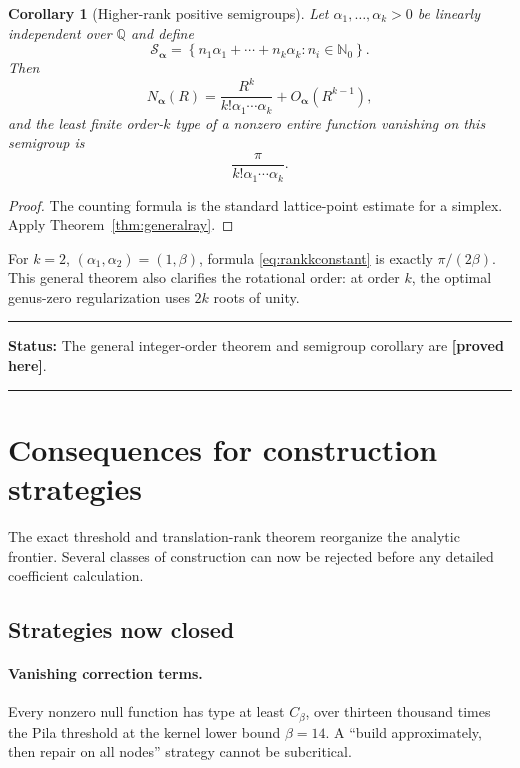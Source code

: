 \documentclass[11pt,oneside]{article}
\newtheorem{corollary}[theorem]{Corollary}
\theoremstyle{definition}
\theoremstyle{remark}
\newcommand{\Nzero}{\mathbb N_0}
\newcommand{\Q}{\mathbb Q}
\newcommand{\Cbeta}{C_\beta}
\newcommand{\statusproved}{\textcolor{provedgreen}{\textbf{[proved here]}}}
\newenvironment{statusbox}[1]
{\begin{center}\begin{minipage}{0.94\textwidth}\raggedright\hrule\vspace{0.45em}\textbf{Status:} #1\par\vspace{0.35em}}
{\vspace{0.35em}\hrule\end{minipage}\end{center}}
\begin{document}
\begin{corollary}[Higher-rank positive semigroups]
\label{cor:rankksemigroup}
Let $\alpha_1,\dots,\alpha_k>0$ be linearly independent over $\Q$ and define
\[
 \mathcal S_{\boldsymbol\alpha}
 =\left\{n_1\alpha_1+\cdots+n_k\alpha_k:n_i\in\Nzero\right\}.
\]
Then
\[
 N_{\boldsymbol\alpha}(R)
 =\frac{R^k}{k!\alpha_1\cdots\alpha_k}+O_{\boldsymbol\alpha}(R^{k-1}),
\]
and the least finite order-$k$ type of a nonzero entire function vanishing on this semigroup
is
\begin{equation}
 \frac{\pi}{k!\alpha_1\cdots\alpha_k}.
 \label{eq:rankkconstant}
\end{equation}
\end{corollary}

\begin{proof}
The counting formula is the standard lattice-point estimate for a simplex.  Apply
Theorem~\ref{thm:generalray}.
\end{proof}

For $k=2$, $(\alpha_1,\alpha_2)=(1,\beta)$, formula
\eqref{eq:rankkconstant} is exactly $\pi/(2\beta)$.  This general theorem also clarifies the
rotational order: at order $k$, the optimal genus-zero regularization uses $2k$ roots of
unity.

\begin{statusbox}{The general integer-order theorem and semigroup corollary are
\statusproved.}
\end{statusbox}

\section{Consequences for construction strategies}
\label{sec:strategy}

The exact threshold and translation-rank theorem reorganize the analytic frontier.  Several
classes of construction can now be rejected before any detailed coefficient calculation.

\subsection{Strategies now closed}

\paragraph{Vanishing correction terms.}
Every nonzero null function has type at least $\Cbeta$, over thirteen thousand times the
Pila threshold at the kernel lower bound $\beta=14$.  A ``build approximately, then repair
on all nodes'' strategy cannot be subcritical.
\end{document}
